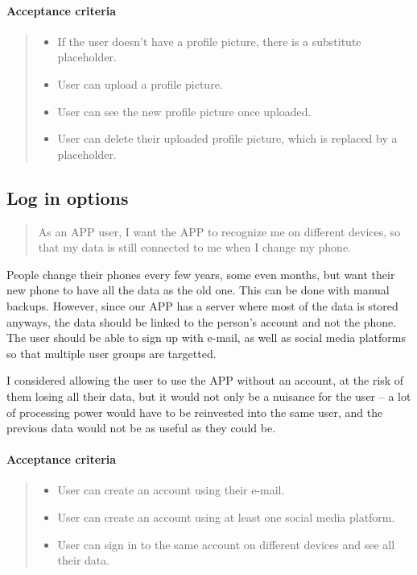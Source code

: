 \paragraph*{Acceptance criteria}
\begin{quote}
\begin{itemize}
    \item If the user doesn't have a profile picture, there is a substitute placeholder.
    \item User can upload a profile picture.
    \item User can see the new profile picture once uploaded.
    \item User can delete their uploaded profile picture, which is replaced by a placeholder.
\end{itemize}
\end{quote}

\subsection{Log in options}\label{US:user-log-in}
\begin{quote}
As an APP user, I want the APP to recognize me on different devices, so that my data is still connected to me when I change my phone.
\end{quote}

People change their phones every few years, some even months, but want their new phone to have all the data as the old one.
This can be done with manual backups.
However, since our APP has a server where most of the data is stored anyways, the data should be linked to the person's account and not the phone.
The user should be able to sign up with e-mail, as well as social media platforms so that multiple user groups are targetted.

I considered allowing the user to use the APP without an account, at the risk of them losing all their data, but it would not only be a nuisance for the user --
a lot of processing power would have to be reinvested into the same user, and the previous data would not be as useful as they could be.

\paragraph*{Acceptance criteria}
\begin{quote}
\begin{itemize}
    \item User can create an account using their e-mail.
    \item User can create an account using at least one social media platform.
    \item User can sign in to the same account on different devices and see all their data.
\end{itemize}
\end{quote}

